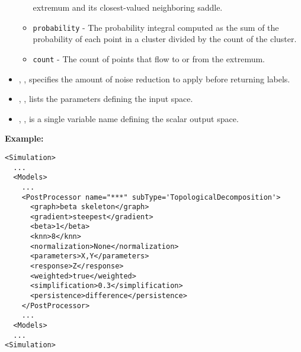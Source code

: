 \begin{itemize}
\begin{itemize}
    extremum and its closest-valued neighboring saddle.
    \item \texttt{probability} - The probability integral computed as the
    sum of the probability of each point in a cluster divided by the count of
    the cluster.
    \item \texttt{count} - The count of points that flow to or from the
    extremum.
  \end{itemize}
  \item {}, , specifies the
  amount of noise reduction to apply before returning labels.
  \item {}, ,
  lists the parameters defining the input space.
  \item {}, , is a single
  variable name defining the scalar output space.
\end{itemize}
\textbf{Example:}
\begin{lstlisting}[style=XML,morekeywords={subType}]
<Simulation>
  ...
  <Models>
    ...
    <PostProcessor name="***" subType='TopologicalDecomposition'>
      <graph>beta skeleton</graph>
      <gradient>steepest</gradient>
      <beta>1</beta>
      <knn>8</knn>
      <normalization>None</normalization>
      <parameters>X,Y</parameters>
      <response>Z</response>
      <weighted>true</weighted>
      <simplification>0.3</simplification>
      <persistence>difference</persistence>
    </PostProcessor>
    ...
  <Models>
  ...
<Simulation>
\end{lstlisting}



%
